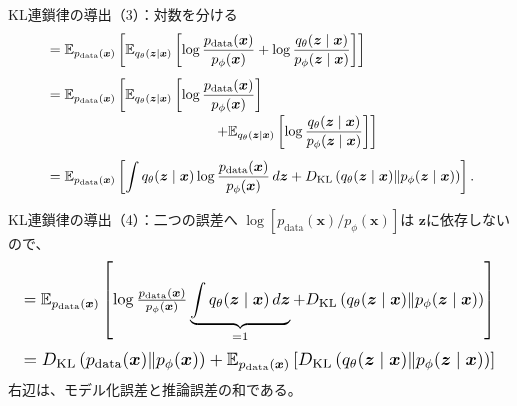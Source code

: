\begin{frame}{KL連鎖律の導出（3）：対数を分ける}
    \scriptsize
    \begin{align*}
        &=
        \mathbb{E}_{p_{\mathrm{data}}(\boldsymbol{x})}
        \left[
        \mathbb{E}_{q_\theta(\boldsymbol{z}\mid\boldsymbol{x})}
        \left[
        \log
        \frac{p_{\mathrm{data}}(\boldsymbol{x})}
        {p_\phi(\boldsymbol{x})}
        +
        \log
        \frac{q_\theta(\boldsymbol{z}\mid\boldsymbol{x})}
        {p_\phi(\boldsymbol{z}\mid\boldsymbol{x})}
        \right]
        \right]\\[4pt]
        &=
        \mathbb{E}_{p_{\mathrm{data}}(\boldsymbol{x})}
        \left[
        \mathbb{E}_{q_\theta(\boldsymbol{z}\mid\boldsymbol{x})}
        \left[
        \log
        \frac{p_{\mathrm{data}}(\boldsymbol{x})}
        {p_\phi(\boldsymbol{x})}
        \right]
        \right.\\[-2pt]
        &\hspace{42mm}\left.
        +
        \mathbb{E}_{q_\theta(\boldsymbol{z}\mid\boldsymbol{x})}
        \left[
        \log
        \frac{q_\theta(\boldsymbol{z}\mid\boldsymbol{x})}
        {p_\phi(\boldsymbol{z}\mid\boldsymbol{x})}
        \right]
        \right]\\[4pt]
        &=
        \mathbb{E}_{p_{\mathrm{data}}(\boldsymbol{x})}
        \left[
        \int q_\theta(\boldsymbol{z}\mid\boldsymbol{x})
        \log
        \frac{p_{\mathrm{data}}(\boldsymbol{x})}
        {p_\phi(\boldsymbol{x})}
        \,d\boldsymbol{z}
        +
        D_{\mathrm{KL}}\left(
        q_\theta(\boldsymbol{z}\mid\boldsymbol{x})
        \|p_\phi(\boldsymbol{z}\mid\boldsymbol{x})
        \right)
        \right].
    \end{align*}
\end{frame}
\begin{frame}{KL連鎖律の導出（4）：二つの誤差へ}
    \scriptsize
    $\log[p_{\mathrm{data}}(\boldsymbol{x})/p_\phi(\boldsymbol{x})]$は
    $\boldsymbol{z}$に依存しないので、
    \[
    \resizebox{0.98\textwidth}{!}{$
        =
        \mathbb{E}_{p_{\mathrm{data}}(\boldsymbol{x})}
        \left[
        \log
        \frac{p_{\mathrm{data}}(\boldsymbol{x})}
        {p_\phi(\boldsymbol{x})}
        \underbrace{
        \int q_\theta(\boldsymbol{z}\mid\boldsymbol{x})
        \,d\boldsymbol{z}
        }_{=1}
        +
        D_{\mathrm{KL}}\left(
        q_\theta(\boldsymbol{z}\mid\boldsymbol{x})
        \|p_\phi(\boldsymbol{z}\mid\boldsymbol{x})
        \right)
        \right]
    $}
    \]
    \[
    \resizebox{0.98\textwidth}{!}{$
        =
        D_{\mathrm{KL}}\left(
        p_{\mathrm{data}}(\boldsymbol{x})
        \|p_\phi(\boldsymbol{x})
        \right)
        +
        \mathbb{E}_{p_{\mathrm{data}}(\boldsymbol{x})}
        \left[
        D_{\mathrm{KL}}\left(
        q_\theta(\boldsymbol{z}\mid\boldsymbol{x})
        \|p_\phi(\boldsymbol{z}\mid\boldsymbol{x})
        \right)
        \right]
    $}
    \]
    \normalsize
    右辺は、モデル化誤差と推論誤差の和である。
\end{frame}
